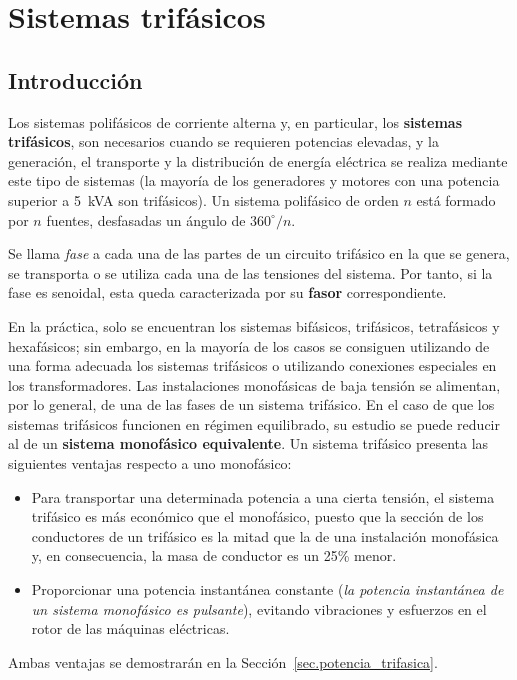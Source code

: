 \chapter{Sistemas trifásicos}
	
	
	\section{Introducción}
	Los sistemas polifásicos de corriente alterna y, en particular, los \textbf{sistemas trifásicos}, son necesarios cuando se requieren potencias elevadas, y la generación, el transporte y la distribución de energía eléctrica se realiza mediante este tipo de sistemas (la mayoría de los generadores y motores con una potencia superior a 5~kVA son trifásicos). Un sistema polifásico de orden $n$ está formado por $n$ fuentes, desfasadas un ángulo de $360^\circ/n$. 
	\begin{remark}
		Se llama \textit{fase} a cada una de las partes de un circuito trifásico en la que se genera, se transporta o se utiliza cada una de las tensiones del sistema. Por tanto, si la fase es senoidal, esta queda caracterizada por su \textbf{fasor} correspondiente.
	\end{remark}
	
	En la práctica, solo se encuentran los sistemas bifásicos, trifásicos, tetrafásicos y hexafásicos; sin embargo, en la mayoría de los casos se consiguen utilizando de una forma adecuada los sistemas trifásicos o utilizando conexiones especiales en los transformadores. Las instalaciones monofásicas de baja tensión se alimentan, por lo general, de una de las fases de un sistema trifásico. En el caso de que los sistemas trifásicos funcionen en régimen equilibrado, su estudio se puede reducir al de un \textbf{sistema monofásico equivalente}. Un sistema trifásico presenta las siguientes ventajas respecto a uno monofásico:
	\begin{itemize}
		\item Para transportar una determinada potencia a una cierta tensión, el sistema trifásico es más económico que el monofásico, puesto que la sección de los conductores de un trifásico es la mitad que la de una instalación monofásica y, en consecuencia, la masa de conductor es un 25\% menor.
		\item Proporcionar una potencia instantánea constante (\emph{la potencia instantánea de un sistema monofásico es pulsante}), evitando vibraciones y esfuerzos en el rotor de las máquinas eléctricas.
	\end{itemize}
	Ambas ventajas se demostrarán en la Sección~\ref{sec.potencia_trifasica}.
	
